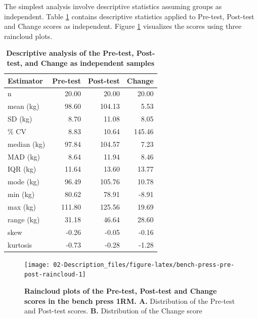 \documentclass[
]{book}
\begin{document}
The simplest analysis involve descriptive statistics assuming groups as independent. Table \ref{tab:bench-press-data-independent-summary} contains descriptive statistics applied to Pre-test, Post-test and Change scores as independent. Figure \ref{fig:bench-press-pre-post-raincloud} visualizes the scores using three raincloud plots.



\begin{table}

\caption{\label{tab:bench-press-data-independent-summary}\textbf{Descriptive analysis of the Pre-test, Post-test, and Change as independent samples}}
\centering
\begin{tabular}[t]{lrrr}
\toprule
Estimator & Pre-test & Post-test & Change\\
\midrule
n & 20.00 & 20.00 & 20.00\\
mean (kg) & 98.60 & 104.13 & 5.53\\
SD (kg) & 8.70 & 11.08 & 8.05\\
\% CV & 8.83 & 10.64 & 145.46\\
median (kg) & 97.84 & 104.57 & 7.23\\
\addlinespace
MAD (kg) & 8.64 & 11.94 & 8.46\\
IQR (kg) & 11.64 & 13.60 & 13.77\\
mode (kg) & 96.49 & 105.76 & 10.78\\
min (kg) & 80.62 & 78.91 & -8.91\\
max (kg) & 111.80 & 125.56 & 19.69\\
\addlinespace
range (kg) & 31.18 & 46.64 & 28.60\\
skew & -0.26 & -0.05 & -0.16\\
kurtosis & -0.73 & -0.28 & -1.28\\
\bottomrule
\end{tabular}
\end{table}

\begin{figure}

{\centering \texttt{[image: 02-Description\_files/figure-latex/bench-press-pre-post-raincloud-1]} 

}

\caption{\textbf{Raincloud plots of the Pre-test, Post-test and Change scores in the bench press 1RM. A. }Distribution of the Pre-test and Post-test scores. \textbf{B.} Distribution of the Change score}\label{fig:bench-press-pre-post-raincloud}
\end{figure}
\end{document}

